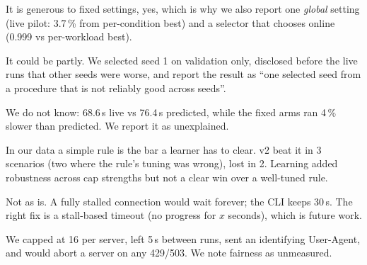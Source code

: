 \A It is generous to fixed settings, yes, which is why we also report one \emph{global} setting (live pilot: 3.7\,\% from per-condition best) and a selector that chooses online (0.999 vs per-workload best).

\A It could be partly. We selected seed 1 on validation only, disclosed before the live runs that other seeds were worse, and report the result as ``one selected seed from a procedure that is not reliably good across seeds''.

\A We do not know: 68.6\,s live vs 76.4\,s predicted, while the fixed arms ran 4\,\% slower than predicted. We report it as unexplained.

\A In our data a simple rule is the bar a learner has to clear. v2 beat it in 3 scenarios (two where the rule's tuning was wrong), lost in 2. Learning added robustness across cap strengths but not a clear win over a well-tuned rule.

\A Not as is. A fully stalled connection would wait forever; the CLI keeps 30\,s. The right fix is a stall-based timeout (no progress for $x$ seconds), which is future work.

\A We capped at 16 per server, left 5\,s between runs, sent an identifying User-Agent, and would abort a server on any 429/503. We note fairness as unmeasured.

